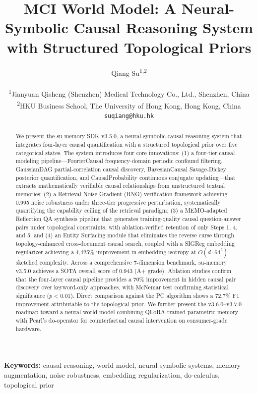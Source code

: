 \documentclass[11pt,a4paper]{article}
\title{\LARGE\bf MCI World Model: A Neural-Symbolic Causal Reasoning System\\with Structured Topological Priors}
\author{
    Qiang Su\textsuperscript{1,2} \\
    \\
    \small\textsuperscript{1}Jianyuan Qisheng (Shenzhen) Medical Technology Co., Ltd., Shenzhen, China \\
    \small\textsuperscript{2}HKU Business School, The University of Hong Kong, Hong Kong, China \\[4pt]
    \small\texttt{suqiang@hku.hk}
}
\date{}
\begin{document}
\maketitle

\begin{abstract}
We present the su-memory SDK v3.5.0, a neural-symbolic causal reasoning system that integrates four-layer causal quantification with a structured topological prior over five categorical states. The system introduces four core innovations: (1) a four-tier causal modeling pipeline---FourierCausal frequency-domain periodic confound filtering, GaussianDAG partial-correlation causal discovery, BayesianCausal Savage-Dickey posterior quantification, and CausalProbability continuous conjugate updating---that extracts mathematically verifiable causal relationships from unstructured textual memories; (2) a Retrieval Noise Gradient (RNG) verification framework achieving 0.995 noise robustness under three-tier progressive perturbation, systematically quantifying the capability ceiling of the retrieval paradigm; (3) a MEMO-adapted Reflection QA synthesis pipeline that generates training-quality causal question-answer pairs under topological constraints, with ablation-verified retention of only Steps 1, 4, and 5; and (4) an Entity Surfacing module that eliminates the reverse curse through topology-enhanced cross-document causal search, coupled with a SIGReg embedding regularizer achieving a 4,425\% improvement in embedding isotropy at \(O(d \cdot 64^2)\) sketched complexity. Across a comprehensive 7-dimension benchmark, su-memory v3.5.0 achieves a SOTA overall score of 0.943 (A+ grade). Ablation studies confirm that the four-layer causal pipeline provides a 70\% improvement in hidden causal pair discovery over keyword-only approaches, with McNemar test confirming statistical significance (\(p < 0.01\)). Direct comparison against the PC algorithm shows a 72.7\% F1 improvement attributable to the topological prior. We further present the v3.6.0--v3.7.0 roadmap toward a neural world model combining QLoRA-trained parametric memory with Pearl's do-operator for counterfactual causal intervention on consumer-grade hardware.
\end{abstract}

\vspace{12pt}
\noindent\textbf{Keywords:} causal reasoning, world model, neural-symbolic systems, memory augmentation, noise robustness, embedding regularization, do-calculus, topological prior

\newpage
\tableofcontents
\newpage
\end{document}
